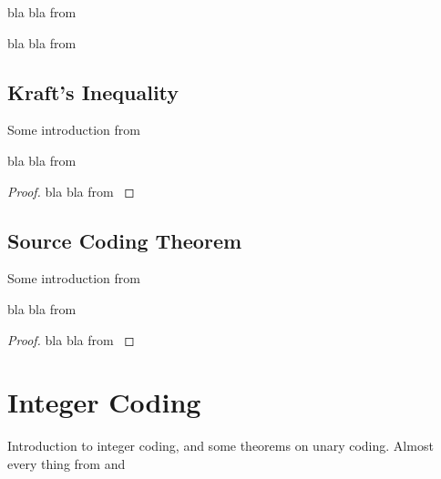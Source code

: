 \begin{definition}\label{def:unique_decodability}
    bla bla from \cite{ElementsofInformationTheory}
\end{definition}

\begin{definition}\label{def:prefix_code}
    bla bla from \cite{ElementsofInformationTheory}
\end{definition}

\subsection{Kraft's Inequality}

Some introduction from \cite{ElementsofInformationTheory}

\begin{theorem}\label{thm:kraft_inequality}
    bla bla from \cite{ElementsofInformationTheory}
\end{theorem}
\begin{proof}
    bla bla from \cite{ElementsofInformationTheory}
\end{proof}

\subsection{Source Coding Theorem}

Some introduction from \cite{ElementsofInformationTheory,Shannon1948,KolmogorovComplexity,han2002mathematics}

\begin{theorem}\label{thm:source_coding_theorem}
    bla bla from \cite{ElementsofInformationTheory,han2002mathematics}
\end{theorem}
\begin{proof}
    bla bla from \cite{ElementsofInformationTheory,han2002mathematics}
\end{proof}







\clearpage
\section{Integer Coding}

Introduction to integer coding, and some theorems on unary coding. Almost every thing from \cite{ferragina2023pearls} and \cite{han2002mathematics}

